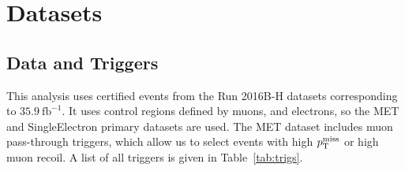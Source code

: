 \section{Datasets}\label{sec:datasets}
\subsection{Data and Triggers}

This analysis uses certified events from the Run 2016B-H datasets corresponding to $35.9~\text{fb}^{-1}$. 
It uses control regions defined by muons, and electrons, so the MET and SingleElectron primary datasets are used. 
The MET dataset includes muon pass-through triggers, which allow us to select events with high $p_{\mathrm{T}}^{\text{miss}}$ or high muon recoil. 
A list of all triggers is given in Table~\ref{tab:trigs}. 

